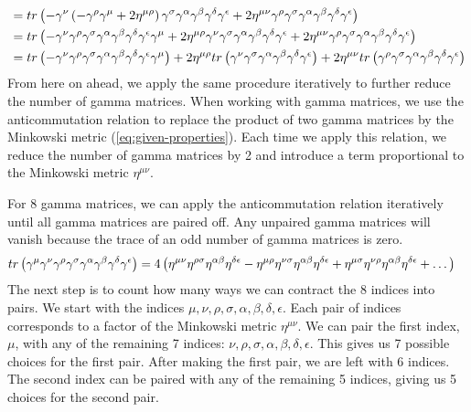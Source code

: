 \begin{enumerate}
\begin{align}
        &= tr\left(-\gamma^\nu \left( -\gamma^\rho \gamma^\mu + 2 \eta^{\mu\rho} \right) \gamma^\sigma \gamma^\alpha \gamma^\beta \gamma^\delta \gamma^\epsilon + 2 \eta^{\mu\nu} \gamma^\rho \gamma^\sigma \gamma^\alpha \gamma^\beta \gamma^\delta \gamma^\epsilon \right)\notag\\
        &= tr\left( -\gamma^\nu \gamma^\rho \gamma^\sigma \gamma^\alpha \gamma^\beta \gamma^\delta \gamma^\epsilon \gamma^\mu + 2 \eta^{\mu\rho} \gamma^\nu \gamma^\sigma \gamma^\alpha \gamma^\beta \gamma^\delta \gamma^\epsilon + 2 \eta^{\mu\nu} \gamma^\rho \gamma^\sigma \gamma^\alpha \gamma^\beta \gamma^\delta \gamma^\epsilon \right)\notag\\
        &= tr\left( -\gamma^\nu \gamma^\rho \gamma^\sigma \gamma^\alpha \gamma^\beta \gamma^\delta \gamma^\epsilon \gamma^\mu \right) + 2 \eta^{\mu\rho} tr\left( \gamma^\nu \gamma^\sigma \gamma^\alpha \gamma^\beta \gamma^\delta \gamma^\epsilon \right) + 2 \eta^{\mu\nu} tr\left( \gamma^\rho \gamma^\sigma \gamma^\alpha \gamma^\beta \gamma^\delta \gamma^\epsilon \right)\notag
    \end{align}
    From here on ahead, we apply the same procedure iteratively to further reduce the number of gamma matrices. When working with gamma matrices, we use the anticommutation relation to replace the product of two gamma matrices by the Minkowski metric (\ref{eq:given-properties}). Each time we apply this relation, we reduce the number of gamma matrices by 2 and introduce a term proportional to the Minkowski metric $\eta^{\mu\nu}$.  
    
    For 8 gamma matrices, we can apply the anticommutation relation iteratively until all gamma matrices are paired off. Any unpaired gamma matrices will vanish because the trace of an odd number of gamma matrices is zero.
    \begin{align}
        tr\left(\gamma^\mu \gamma^\nu \gamma^\rho \gamma^\sigma \gamma^\alpha \gamma^\beta \gamma^\delta \gamma^\epsilon\right) &= 4 \left( \eta^{\mu\nu} \eta^{\rho\sigma} \eta^{\alpha\beta} \eta^{\delta\epsilon} - \eta^{\mu\rho} \eta^{\nu\sigma} \eta^{\alpha\beta} \eta^{\delta\epsilon} + \eta^{\mu\sigma} \eta^{\nu\rho} \eta^{\alpha\beta} \eta^{\delta\epsilon} + \dots \right) \notag
    \end{align}
    The next step is to count how many ways we can contract the 8 indices into pairs. We start with the indices $\mu, \nu, \rho, \sigma, \alpha, \beta, \delta, \epsilon$. Each pair of indices corresponds to a factor of the Minkowski metric $\eta^{\mu\nu}$. We can pair the first index, $\mu$, with any of the remaining 7 indices: $\nu, \rho, \sigma, \alpha, \beta, \delta, \epsilon$. This gives us 7 possible choices for the first pair. After making the first pair, we are left with 6 indices. The second index can be paired with any of the remaining 5 indices, giving us 5 choices for the second pair.
    

\end{enumerate}
